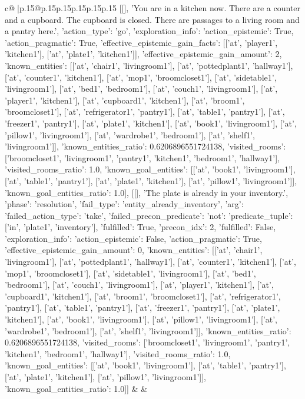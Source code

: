 \documentclass{article}
\begin{document}
{\begin{supertabular}{c@{$\;$}|p{.15\linewidth}@{}p{.15\linewidth}p{.15\linewidth}p{.15\linewidth}p{.15\linewidth}p{.15\linewidth}}
{{{[[], 'You are in a kitchen now. There are a counter and a cupboard. The cupboard is closed. There are passages to a living room and a pantry here.', {'action_type': 'go', 'exploration_info': {'action_epistemic': True, 'action_pragmatic': True, 'effective_epistemic_gain_facts': [['at', 'player1', 'kitchen1'], ['at', 'plate1', 'kitchen1']], 'effective_epistemic_gain_amount': 2, 'known_entities': [['at', 'chair1', 'livingroom1'], ['at', 'pottedplant1', 'hallway1'], ['at', 'counter1', 'kitchen1'], ['at', 'mop1', 'broomcloset1'], ['at', 'sidetable1', 'livingroom1'], ['at', 'bed1', 'bedroom1'], ['at', 'couch1', 'livingroom1'], ['at', 'player1', 'kitchen1'], ['at', 'cupboard1', 'kitchen1'], ['at', 'broom1', 'broomcloset1'], ['at', 'refrigerator1', 'pantry1'], ['at', 'table1', 'pantry1'], ['at', 'freezer1', 'pantry1'], ['at', 'plate1', 'kitchen1'], ['at', 'book1', 'livingroom1'], ['at', 'pillow1', 'livingroom1'], ['at', 'wardrobe1', 'bedroom1'], ['at', 'shelf1', 'livingroom1']], 'known_entities_ratio': 0.6206896551724138, 'visited_rooms': ['broomcloset1', 'livingroom1', 'pantry1', 'kitchen1', 'bedroom1', 'hallway1'], 'visited_rooms_ratio': 1.0, 'known_goal_entities': [['at', 'book1', 'livingroom1'], ['at', 'table1', 'pantry1'], ['at', 'plate1', 'kitchen1'], ['at', 'pillow1', 'livingroom1']], 'known_goal_entities_ratio': 1.0}}], [[], 'The plate is already in your inventory.', {'phase': 'resolution', 'fail_type': 'entity_already_inventory', 'arg': {'failed_action_type': 'take', 'failed_precon_predicate': {'not': {'predicate_tuple': ['in', 'plate1', 'inventory'], 'fulfilled': True, 'precon_idx': 2}, 'fulfilled': False}}, 'exploration_info': {'action_epistemic': False, 'action_pragmatic': True, 'effective_epistemic_gain_amount': 0, 'known_entities': [['at', 'chair1', 'livingroom1'], ['at', 'pottedplant1', 'hallway1'], ['at', 'counter1', 'kitchen1'], ['at', 'mop1', 'broomcloset1'], ['at', 'sidetable1', 'livingroom1'], ['at', 'bed1', 'bedroom1'], ['at', 'couch1', 'livingroom1'], ['at', 'player1', 'kitchen1'], ['at', 'cupboard1', 'kitchen1'], ['at', 'broom1', 'broomcloset1'], ['at', 'refrigerator1', 'pantry1'], ['at', 'table1', 'pantry1'], ['at', 'freezer1', 'pantry1'], ['at', 'plate1', 'kitchen1'], ['at', 'book1', 'livingroom1'], ['at', 'pillow1', 'livingroom1'], ['at', 'wardrobe1', 'bedroom1'], ['at', 'shelf1', 'livingroom1']], 'known_entities_ratio': 0.6206896551724138, 'visited_rooms': ['broomcloset1', 'livingroom1', 'pantry1', 'kitchen1', 'bedroom1', 'hallway1'], 'visited_rooms_ratio': 1.0, 'known_goal_entities': [['at', 'book1', 'livingroom1'], ['at', 'table1', 'pantry1'], ['at', 'plate1', 'kitchen1'], ['at', 'pillow1', 'livingroom1']], 'known_goal_entities_ratio': 1.0}}]] 
	  } 
	   } 
	   } 
	 & & \\ 
 


\end{supertabular}}
\end{document}
